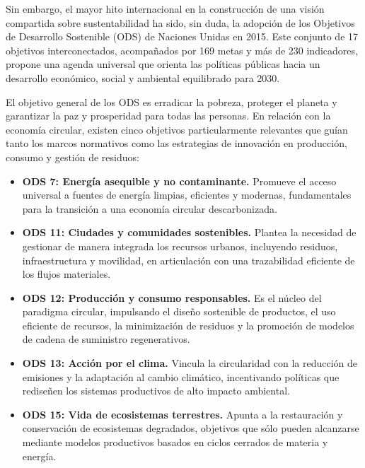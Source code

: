 Sin embargo, el mayor hito internacional en la construcción de una visión compartida sobre sustentabilidad ha sido, sin duda, la adopción de los Objetivos de Desarrollo Sostenible (ODS) de Naciones Unidas en 2015. Este conjunto de 17 objetivos interconectados, acompañados por 169 metas y más de 230 indicadores, propone una agenda universal que orienta las políticas públicas hacia un desarrollo económico, social y ambiental equilibrado para 2030.


El objetivo general de los ODS es erradicar la pobreza, proteger el planeta y garantizar la paz y prosperidad para todas las personas. En relación con la economía circular, existen cinco objetivos particularmente relevantes que guían tanto los marcos normativos como las estrategias de innovación en producción, consumo y gestión de residuos:

\begin{itemize}
\item \textbf{ODS 7: Energía asequible y no contaminante.} Promueve el acceso universal a fuentes de energía limpias, eficientes y modernas, fundamentales para la transición a una economía circular descarbonizada.
\item \textbf{ODS 11: Ciudades y comunidades sostenibles.} Plantea la necesidad de gestionar de manera integrada los recursos urbanos, incluyendo residuos, infraestructura y movilidad, en articulación con una trazabilidad eficiente de los flujos materiales.
\item \textbf{ODS 12: Producción y consumo responsables.} Es el núcleo del paradigma circular, impulsando el diseño sostenible de productos, el uso eficiente de recursos, la minimización de residuos y la promoción de modelos de cadena de suministro regenerativos.
\item \textbf{ODS 13: Acción por el clima.} Vincula la circularidad con la reducción de emisiones y la adaptación al cambio climático, incentivando políticas que rediseñen los sistemas productivos de alto impacto ambiental.
\item \textbf{ODS 15: Vida de ecosistemas terrestres.} Apunta a la restauración y conservación de ecosistemas degradados, objetivos que sólo pueden alcanzarse mediante modelos productivos basados en ciclos cerrados de materia y energía.
\end{itemize}

